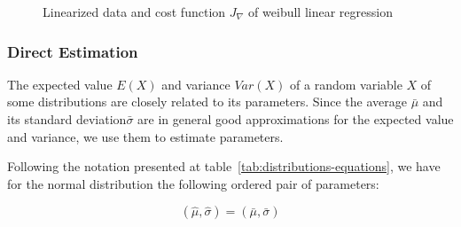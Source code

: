 \begin{figure}[ht!]
\centering
{}
\label{fig:linearization-cost}
\caption{Linearized data and cost function $J_\nabla$ of weibull linear regression}
\end{figure}


\subsubsection{Direct Estimation}

The expected value  $E(X)$ and variance $Var(X)$ of a random variable $X$ of some distributions are closely related to its parameters. Since the average $\bar{\mu}$ and its standard deviation$\bar{\sigma}$ are in general good approximations for the expected value and variance, we use them to estimate parameters.

Following the notation presented at table~\ref{tab:distributions-equations}, we have for the normal distribution the following ordered pair of parameters:

\begin{equation}
(\hat{\mu}, \hat{\sigma}) = (\bar{\mu}, \bar{\sigma})
\end{equation}

